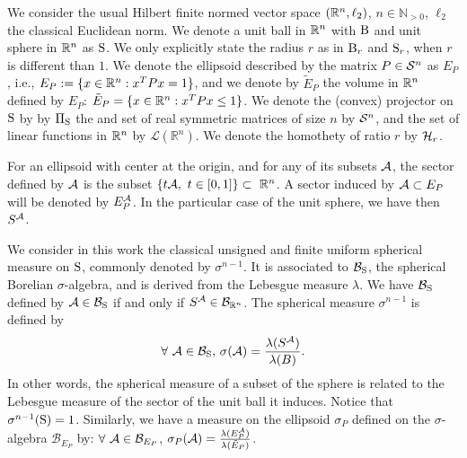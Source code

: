 We consider the usual Hilbert finite normed vector space $(\mathbb{R}^n,\ell_2)$, $n \in \mathbb{N}_{> 0}$, $\ell_2$ the classical Euclidean norm. We denote a unit ball in $\mathbb{R}^n$ with $\text{B}$ and unit sphere in $\mathbb{R}^n$ as $\text{S}$. We only explicitly state the radius $r$ as in $\text{B}_r$ and $\text{S}_r$, when $r$ is different than $1$. We denote the ellipsoid described by the matrix $P \in \mathcal{S}^n$ as $E_P$, i.e., $E_P:= \{x \in \mathbb{R}^n: x^TPx = 1\}$, and we denote by $\tilde{E}_P$ the volume in $\mathbb{R}^n$ defined by $E_P$: $\tilde{E}_P = \{x \in \mathbb{R}^n: x^TPx \leq 1\}$. We denote the (convex) projector on $\text{S}$ by  by $\Pi_{\text{S}}$ the and set of real symmetric matrices of size $n$ by $\mathcal{S}^n$, and the set of linear functions in $\mathbb{R}^n$ by $\mathcal{L}(\mathbb{R}^n)$. We denote the homothety of ratio $r$ by $\mathcal{H}_{r}$. 


For an ellipsoid with center at the origin, and for any of its subsets $\mathcal{A}$, the sector defined by $\mathcal{A}$ is the subset $\{t \mathcal{A}, \ t \in [0,1]\} \subset\ \mathbb{R}^n$. A sector induced by $\mathcal{A} \subset E_P$ will be denoted by $E_P^{\mathcal{A}}$. In the particular case of the unit sphere, we have then $S^{\mathcal{A}}$.

We consider in this work the classical unsigned and finite uniform spherical measure on $\text{S}$, commonly denoted by $\sigma^{n-1}$. It is associated to $\mathcal{B}_{\text{S}}$, the spherical Borelian $\sigma$-algebra, and is derived from the Lebesgue measure $\lambda$. We have $\mathcal{B}_{\text{S}}$ defined by $\mathcal{A} \in \mathcal{B}_{\text{S}}$ if and only if $S^{\mathcal{A}} \in \mathcal{B}_{\mathbb{R}^n}$. The spherical measure $\sigma^{n-1}$ is defined by
$$\forall\ \mathcal{A} \in \mathcal{B}_{\text{S}},\, \sigma(\mathcal{A}) = \frac{\lambda(S^{\mathcal{A}})}{\lambda(B)}. $$
In other words, the spherical measure of a subset of the sphere is related to the Lebesgue measure of the sector of the unit ball it induces. Notice that $\sigma^{n-1}(\text{S}) = 1$.
Similarly, we have a measure on the ellipsoid $\sigma_P$ defined on the $\sigma$-algebra $\mathcal{B}_{E_P}$ by: $\forall\ \mathcal{A} \in \mathcal{B}_{E_P}$, $\sigma_P(\mathcal{A}) = \frac{\lambda(E_P^{\mathcal{A}})}{\lambda(\tilde{E}_P)}$.
